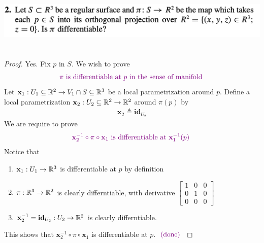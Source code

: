 \documentclass{report}
\begin{document}
\begin{question}{}{}
\includegraphics[height=3cm,width=18cm]{HW3a6}
\end{question}
\begin{proof}
Yes. Fix $p$ in  $S$. We wish to prove 
 \begin{align*}
\textcolor{violet}{\pi\text{ is differentiable at $p$ in the sense of manifold }}
\end{align*}
Let $\textbf{x}_1:U_1\subseteq \mathbb{R}^2 \rightarrow V_1 \cap  S\subseteq \mathbb{R}^3$ be a local parametrization around $p$. Define a local parametrization $\textbf{x}_2:U_2 \subseteq \mathbb{R}^2 \rightarrow \mathbb{R}^2 $ around $\pi(p)$ by 
\begin{align*}
\textbf{x}_2\triangleq \textbf{id}_{U_2}
\end{align*}
We are require to prove 
\begin{align*}
  \textcolor{violet}{\textbf{x}_2^{-1}\circ \pi \circ \textbf{x}_1\text{ is differentiable at $\textbf{x}_1^{-1}(p)$ }}
\end{align*}
Notice that 
\begin{enumerate}[label=(\alph*)]
  \item $\textbf{x}_1:U_1 \rightarrow \mathbb{R}^3$ is differentiable at $p$ by definition 
  \item $\pi :\mathbb{R}^3 \rightarrow \mathbb{R}^2$ is clearly differntiable, with derivative $\begin{bmatrix}
      1 & 0 &0 \\
      0 & 1 &0 \\
      0 & 0 &0 
  \end{bmatrix}$
  \item $\textbf{x}_2^{-1}=\textbf{id}_{U_2}:U_2 \rightarrow \mathbb{R}^2$ is clearly differntiable. 
\end{enumerate}
This shows that $\textbf{x}_2^{-1}\circ  \pi \circ  \textbf{x}_1$ is differentiable at $p$. $\textcolor{violet}{\text{ (done) }}$ 
\end{proof}
\end{document}
